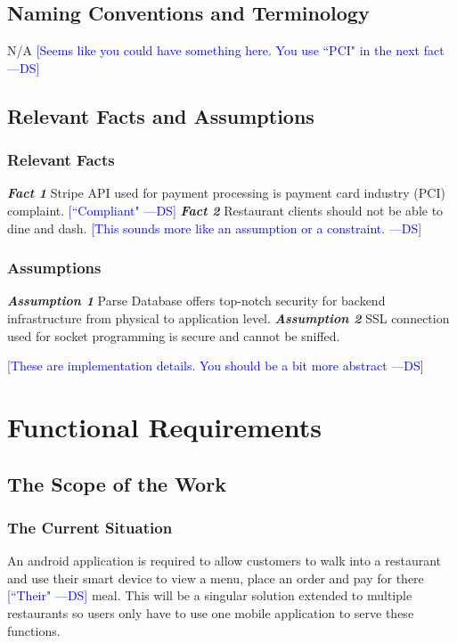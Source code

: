 \documentclass[12pt, titlepage]{article}
\newcommand{\authornote}[3]{\textcolor{#1}{[#3 ---#2]}}
\newcommand{\authornote}[3]{}
\newcommand{\ds}[1]{\authornote{blue}{DS}{#1}}
\begin{document}
\subsection{Naming Conventions and Terminology}
N/A \ds{Seems like you could have something here. You use ``PCI" in the next fact}
\subsection{Relevant Facts and Assumptions} 
\subsubsection{Relevant Facts}
\textbf{\textit{Fact 1}}\newline
Stripe API used for payment processing is payment card industry (PCI) complaint. \ds{``Compliant"}
\newline\newline
\textbf{\textit{Fact 2}}\newline
Restaurant clients should not be able to dine and dash. 
\ds{This sounds more like an assumption or a constraint.}
\newline

\subsubsection{Assumptions}

\textbf{\textit{Assumption  1}}\newline
Parse Database offers top-notch security for backend infrastructure from physical to application level.
\newline\newline
\textbf{\textit{Assumption  2}}\newline
SSL connection used for socket programming is secure and cannot be sniffed.

\ds{These are implementation details. You should be a bit more abstract}

\section{Functional Requirements} 

\subsection{The Scope of the Work}
\subsubsection{The Current Situation}
An android application is required to allow customers to walk into a restaurant and use their smart device to view a menu, place an order and pay for there \ds{``Their"} meal. This will be a singular solution extended to multiple restaurants so users only have to use one mobile application to serve these functions.
\end{document}
